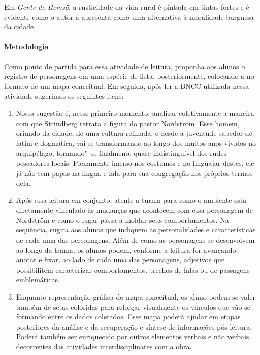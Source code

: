 \documentclass[12pt]{extarticle}
\begin{document}
Em \textit{Gente de Hemsö}, a rusticidade da vida rural é pintada em tintas
fortes e é evidente como o autor a apresenta como uma
alternativa à moralidade burguesa da cidade. 

\paragraph{Metodologia}


Como ponto de partida para essa atividade de leitura, proponha aos alunos 
o registro de personagens em uma espécie de lista, posteriormente, colocando-a 
no formato de um mapa conceitual. Em seguida, após ler a BNCC utilizada nessa atividade
sugerimos os seguintes itens:

\begin{enumerate}

\item
Nossa sugestão é, nesse primeiro momento, analisar coletivamente a maneira 
com que Strindberg retrata a figura do pastor Nordström. Esse homem, 
oriundo da cidade, de uma cultura refinada, e desde a juventude sabedor
de latim e dogmática, vai se transformando ao longo dos muitos anos vividos 
no arquipélago, tornando"--se finalmente quase indistinguível dos rudes 
pescadores locais. Plenamente imerso nos costumes e no linguajar destes, 
ele já não tem papas na língua e fala para sua congregação nos próprios 
termos dela.

\item
Após essa leitura em conjunto, atente a turma para como o ambiente está 
diretamente vinculado às mudanças que acontecem com essa personagem de 
Nordström e como o lugar passa a moldar seus comportamentos. Na sequência, 
sugira aos alunos que indiquem as personalidades e características de cada 
uma das personagens. Além de como as personagens se desenvolvem ao longo 
da trama, os alunos podem, conforme a leitura for avançando, anotar e 
fixar, ao lado de cada uma das personagens, adjetivos que possibilitem 
caracterizar comportamentos, trechos de falas ou de passagens emblemáticas. 

\item
Enquanto representação gráfica do mapa conceitual, os aluno podem se valer 
também de setas coloridas para reforçar visualmente os vínculos que vão 
se formando entre os dados coletados. Esse mapa poderá ajudar em etapas 
posteriores da análise e da recuperação e síntese de informações pós-leitura. 
Poderá também ser enriquecido por outros elementos verbais e não verbais, 
decorrentes das atividades interdisciplinares com a obra.

\end{enumerate}
\end{document}
